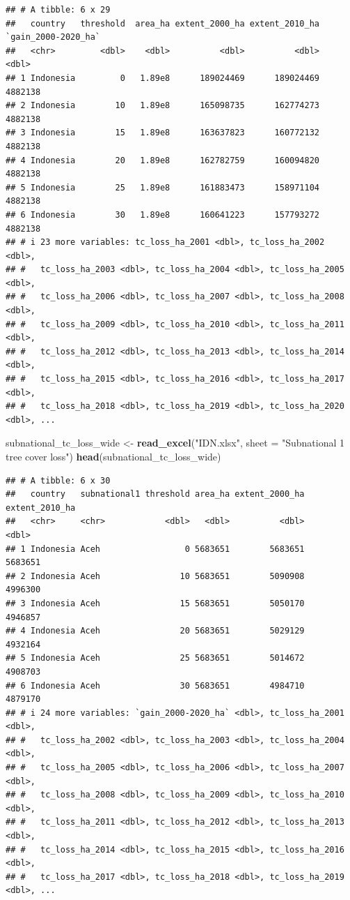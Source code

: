 \documentclass[
]{article}
\newenvironment{Shaded}{\begin{snugshade}}{\end{snugshade}}
\newcommand{\AttributeTok}[1]{\textcolor[rgb]{0.13,0.29,0.53}{#1}}
\newcommand{\FunctionTok}[1]{\textcolor[rgb]{0.13,0.29,0.53}{\textbf{#1}}}
\newcommand{\NormalTok}[1]{#1}
\newcommand{\OtherTok}[1]{\textcolor[rgb]{0.56,0.35,0.01}{#1}}
\newcommand{\StringTok}[1]{\textcolor[rgb]{0.31,0.60,0.02}{#1}}
\begin{document}
\begin{verbatim}
## # A tibble: 6 x 29
##   country   threshold  area_ha extent_2000_ha extent_2010_ha `gain_2000-2020_ha`
##   <chr>         <dbl>    <dbl>          <dbl>          <dbl>               <dbl>
## 1 Indonesia         0   1.89e8      189024469      189024469             4882138
## 2 Indonesia        10   1.89e8      165098735      162774273             4882138
## 3 Indonesia        15   1.89e8      163637823      160772132             4882138
## 4 Indonesia        20   1.89e8      162782759      160094820             4882138
## 5 Indonesia        25   1.89e8      161883473      158971104             4882138
## 6 Indonesia        30   1.89e8      160641223      157793272             4882138
## # i 23 more variables: tc_loss_ha_2001 <dbl>, tc_loss_ha_2002 <dbl>,
## #   tc_loss_ha_2003 <dbl>, tc_loss_ha_2004 <dbl>, tc_loss_ha_2005 <dbl>,
## #   tc_loss_ha_2006 <dbl>, tc_loss_ha_2007 <dbl>, tc_loss_ha_2008 <dbl>,
## #   tc_loss_ha_2009 <dbl>, tc_loss_ha_2010 <dbl>, tc_loss_ha_2011 <dbl>,
## #   tc_loss_ha_2012 <dbl>, tc_loss_ha_2013 <dbl>, tc_loss_ha_2014 <dbl>,
## #   tc_loss_ha_2015 <dbl>, tc_loss_ha_2016 <dbl>, tc_loss_ha_2017 <dbl>,
## #   tc_loss_ha_2018 <dbl>, tc_loss_ha_2019 <dbl>, tc_loss_ha_2020 <dbl>, ...
\end{verbatim}

\begin{Shaded}
\begin{Highlighting}[]
\NormalTok{subnational\_tc\_loss\_wide }\OtherTok{\textless{}{-}} \FunctionTok{read\_excel}\NormalTok{(}\StringTok{"IDN.xlsx"}\NormalTok{, }\AttributeTok{sheet =} \StringTok{"Subnational 1 tree cover loss"}\NormalTok{)}
\FunctionTok{head}\NormalTok{(subnational\_tc\_loss\_wide)}
\end{Highlighting}
\end{Shaded}

\begin{verbatim}
## # A tibble: 6 x 30
##   country   subnational1 threshold area_ha extent_2000_ha extent_2010_ha
##   <chr>     <chr>            <dbl>   <dbl>          <dbl>          <dbl>
## 1 Indonesia Aceh                 0 5683651        5683651        5683651
## 2 Indonesia Aceh                10 5683651        5090908        4996300
## 3 Indonesia Aceh                15 5683651        5050170        4946857
## 4 Indonesia Aceh                20 5683651        5029129        4932164
## 5 Indonesia Aceh                25 5683651        5014672        4908703
## 6 Indonesia Aceh                30 5683651        4984710        4879170
## # i 24 more variables: `gain_2000-2020_ha` <dbl>, tc_loss_ha_2001 <dbl>,
## #   tc_loss_ha_2002 <dbl>, tc_loss_ha_2003 <dbl>, tc_loss_ha_2004 <dbl>,
## #   tc_loss_ha_2005 <dbl>, tc_loss_ha_2006 <dbl>, tc_loss_ha_2007 <dbl>,
## #   tc_loss_ha_2008 <dbl>, tc_loss_ha_2009 <dbl>, tc_loss_ha_2010 <dbl>,
## #   tc_loss_ha_2011 <dbl>, tc_loss_ha_2012 <dbl>, tc_loss_ha_2013 <dbl>,
## #   tc_loss_ha_2014 <dbl>, tc_loss_ha_2015 <dbl>, tc_loss_ha_2016 <dbl>,
## #   tc_loss_ha_2017 <dbl>, tc_loss_ha_2018 <dbl>, tc_loss_ha_2019 <dbl>, ...
\end{verbatim}
\end{document}
